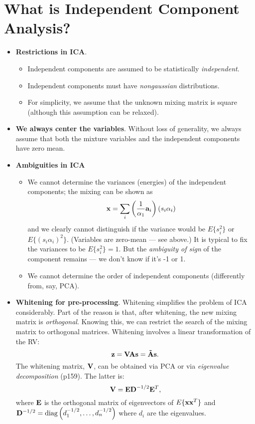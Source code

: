 \documentclass[a4paper]{book}
\begin{document}




\chapter{What is Independent Component Analysis?}

\begin{itemize}
\item \textbf{Restrictions in ICA}.
	\begin{itemize}
	\item Independent components are assumed to be statistically \textit{independent}.
	\item Independent components must have \textit{nongaussian} distributions.
	\item For simplicity, we assume that the unknown mixing matrix is square (although this assumption can be relaxed).
	\end{itemize}
	\item \textbf{We always center the variables}. Without loss of generality, we always assume that both the mixture variables and the independent components have zero mean.
\item \textbf{Ambiguities in ICA}
	\begin{itemize}
	\item We cannot determine the variances (energies) of the independent components; the mixing can be shown as $$\mathbf{x} = \sum\limits_i \left( \frac{1}{\alpha_1}\mathbf{a}_i \right)(s_i\alpha_i)$$
	and we clearly cannot distinguish if the variance would be $E\{s_i^2\}$ or $E\{(s_i\alpha_i)^2\}$. (Variables are zero-mean \---- see above.) It is typical to fix the variances to be $E\{s_i^2\}=1$. But the \textit{ambiguity of sign} of the component remains \---- we don't know if it's -1 or 1.
	\item We cannot determine the order of independent components (differently from, say, PCA).
	\end{itemize}
\item \textbf{Whitening for pre-processing}. Whitening simplifies the problem of ICA considerably. Part of the reason is that, after whitening, the new mixing matrix is \textit{orthogonal}. Knowing this, we can restrict the search of the mixing matrix to orthogonal matrices. Whitening involves a linear transformation of the RV:%
$$\mathbf{z=VAs=\tilde{A}s}.$$
The whitening matrix, $\mathbf V$, can be obtained via PCA or via \textit{eigenvalue decomposition} (p159). The latter is: $$\mathbf{V=ED}^{-1/2}\mathbf{E}^T,$$ 
where $\mathbf E$ is the orthogonal matrix of eigenvectors of $E\{\mathbf{xx}^T\}$ and $\mathbf D^{-1/2} = \text{diag}\left(d_1^{-1/2},\hdots,d_n^{-1/2}\right)$ where $d_i$ are the eigenvalues.


\end{itemize}
\end{document}
